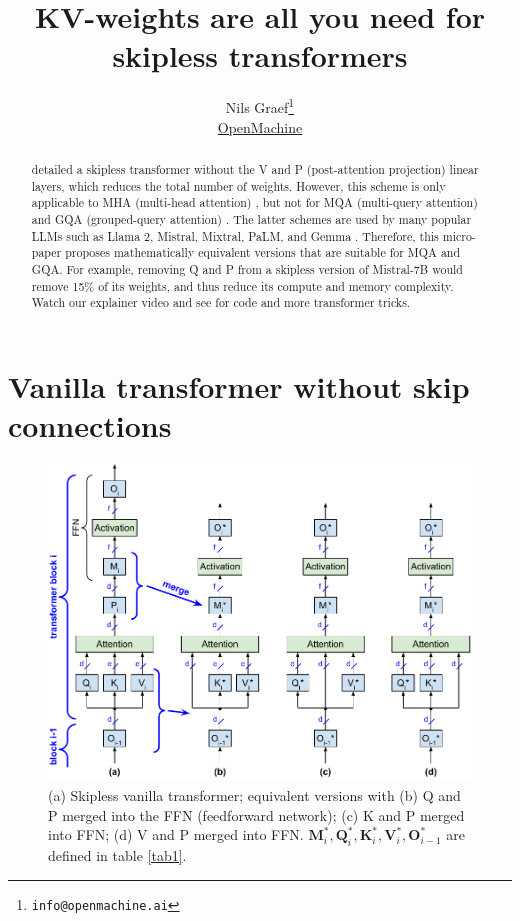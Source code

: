 \documentclass{article}
\title{KV-weights are all you need for skipless transformers}
\author{Nils Graef\thanks{\texttt{info@openmachine.ai}} \\
  \href{https://openmachine.ai}{OpenMachine}}
\newcommand{\mat}[1]{\mathbf{#1}}  %
\def\Q{\mat{Q}_i}
\def\K{\mat{K}_i}
\def\V{\mat{V}_i}
\def\O{\mat{O}_{i-1}}
\def\M{\mat{M}_i}
\begin{document}
 \maketitle

\begin{abstract}
\citet{simplified} detailed a skipless transformer without the V and P (post-attention projection) linear layers, which reduces the total number of weights. However, this scheme is only applicable to MHA (multi-head attention) \cite{vanilla}, but not for MQA (multi-query attention) \cite{MQA} and GQA (grouped-query attention) \cite{GQA}. The latter schemes are used by many popular LLMs such as Llama 2, Mistral, Mixtral, PaLM, and Gemma \cite{Llama2, mistral, mixtral, PaLM, gemma}. Therefore, this micro-paper \cite{micro-paper} proposes mathematically equivalent versions that are suitable for MQA and GQA. For example, removing Q and P from a skipless version of Mistral-7B would remove 15\% of its weights, and thus reduce its compute and memory complexity. Watch our explainer video \citep{remove-video} and see \citep{tricks, slimAttn, precompute} for code and more transformer tricks.
\end{abstract}

\section{Vanilla transformer without skip connections}

\begin{figure}[h!] \centering %
  \includegraphics[scale=0.87]{../doc/fig/removeWeights_fig1.pdf}
  \caption{(a) Skipless vanilla transformer; equivalent versions with (b) Q and P merged into the FFN (feedforward network); (c) K and P merged into FFN; (d) V and P merged into FFN. $\M^*, \Q^*, \K^*, \V^*, \O^*$ are defined in table \ref{tab1}.}
\label{fig1} \end{figure}
\end{document}
